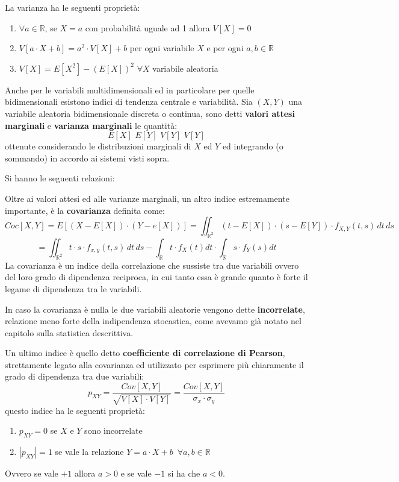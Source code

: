 \documentclass[a4paper,12pt, oneside]{book}
\newcommand{\numberset}{\mathbb}
\newcommand{\R}{\numberset{R}}
\begin{document}
La varianza ha le seguenti proprietà:
\begin{enumerate}
    \item $\forall a \in \R$, se $X = a$ con probabilità uguale ad 1 allora $V[X] = 0$
    \item $V[a\cdot X + b] = a^2 \cdot V[X] + b$ per ogni variabile $X$ e per ogni $a,b \in \R$
    \item $V[X] = E[X^2] - (E[X])^2\,\,\forall X$ variabile aleatoria
\end{enumerate}
Anche per le variabili multidimensionali ed in particolare per quelle bidimensionali 
esistono indici di tendenza centrale e variabilità.\newline
Sia $(X,Y)$ una variabile aleatoria bidimensionale discreta o continua, sono detti \textbf{valori attesi marginali} 
e \textbf{varianza marginali }le quantità:
\[E[X]\,\,E[Y]\,\,V[Y]\,\,V[Y]\]
ottenute considerando le distribuzioni marginali di $X$ ed $Y $ ed integrando (o sommando) in accordo ai sistemi visti sopra.

Si hanno le seguenti relazioni:
\begin{itemize}
    \item $E[a\cdot X + b \cdot Y] = a\cdot E[X] + b\cdot E[Y]\,\,\forall \mbox{ coppia }X,Y \mbox{ e }
                                     \forall a,b \in \R}$
    \item $E[X \cdot Y] = E[X]\cdot E[Y]\,\,\forall \mbox{ coppia }X,Y \mbox{ stocasticamente indipendenti}$
    \item $V[X + Y]= V[X] + V[Y]\,\,\forall \mbox{ coppia }X,Y \mbox{ stocasticamente indipendenti}$
\end{itemize}
Oltre ai valori attesi ed alle varianze marginali, un altro indice estremamente importante, 
è la \textbf{covarianza} definita come:
\[Coc[X, Y] = E[(X-E[X])\cdot(Y-e[X])] = \iint_{\R^2} (t - E[X])\cdot (s - E[Y])\cdot f_{X,Y}(t,s)\,dt\,ds\]
\[=\iint_{\mathbb{R}^2} t \cdot s\cdot f_{x,y}(t,s)\,dt\,ds-\int_{\mathbb{R}}t\cdot f_X(t)dt\cdot \int_{\mathbb{R}}s\cdot f_Y(s)dt\]
La covarianza è un indice della correlazione che sussiste tra due variabili ovvero del loro grado di
dipendenza reciproca, in cui tanto essa è grande quanto è forte il legame di dipendenza tra le variabili.

In caso la covarianza è nulla le due variabili aleatorie vengono dette \textbf{incorrelate}, relazione 
meno forte della indipendenza stocastica, come avevamo già notato nel capitolo sulla statistica descrittiva.

Un ultimo indice è quello detto \textbf{coefficiente di correlazione di Pearson}, strettamente legato 
alla covarianza ed utilizzato per esprimere più chiaramente il grado di dipendenza tra due variabili:
\[p_{XY} = \frac{Cov[X,Y]}{\sqrt{V[X]\cdot V[Y]}} = \frac{Cov[X,Y]}{\sigma_x\cdot \sigma_y}\]
questo indice ha le seguenti proprietà:
\begin{enumerate}
    \item $p_{XY}=0$ se $X$ e $Y$ sono incorrelate
    \item $|p_{XY}|=1$ se vale la relazione $Y=a\cdot X+b\,\,\,\forall a,b\in \mathbb{R}$
\end{enumerate}
Ovvero se vale $+1$ allora $a>0$ e se vale $-1$ si ha che $a<0$.
\end{document}
